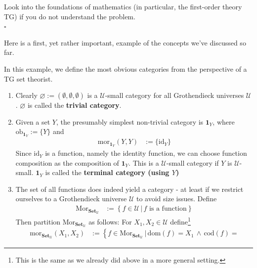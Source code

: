 \begin{prf}
Look into the foundations of mathematics (in particular, the first-order theory TG) if you do not understand the problem.
\\
\phantom{proven}
\hfill
$\square$
\end{prf}
Here is a first, yet rather important, example of the concepts we've discussed so far.
\\
\begin{exa}
\label{exa:basiccats1}
In this example, we define the most obvious categories from the perspective of a TG set theorist.
\begin{enumerate}
\item[(a)]
Clearly $\mathbf{\varnothing} := (\emptyset,\emptyset,\emptyset)$ is a $\mathcal{U}$-small category for all Grothendieck universes $\mathcal{U}$.
$\mathbf{\varnothing}$ is called the \textbf{trivial category}.
\item[(b)]
Given a set $Y$, the presumably simplest non-trivial category is $\mathbf{1}_{Y}$, where $\mathrm{ob}_{\mathbf{1}_{Y}} := \lbrace Y \rbrace$ and
\begin{align*}
  \mathrm{mor}_{\mathbf{1}_{Y}}(Y,Y)
  &:=
  \lbrace
    \mathrm{id}_{Y}
  \rbrace
\end{align*}
Since $\mathrm{id}_{Y}$ is a function, namely the identity function, we can choose function composition as the composition of $\mathbf{1}_{Y}$.
This is a $\mathcal{U}$-small category if $Y$ is $\mathcal{U}$-small.
$\mathbf{1}_{Y}$ is called the \textbf{terminal category (using $Y$)}
\item[(c)]
The set of all functions does indeed yield a category - at least if we restrict ourselves to a Grothendieck universe $\mathcal{U}$ to avoid size issues.
Define
\begin{align*}
  \mathrm{Mor}_{\mathbf{Set}_{\mathcal{U}}}
  &:=
  \left\lbrace
      f
      \in
      \mathcal{U}
    \,
    \vert
    \,
      f
      \text{ is a function}
  \right\rbrace
\end{align*}
Then partition $\mathrm{Mor}_{\mathbf{Set}_{\mathcal{U}}}$ as follows: For $X_{1},X_{2} \in \mathcal{U}$ define\footnote{This is the same as we already did above in a more general setting.}
\begin{align*}
  \mathrm{mor}_{\mathbf{Set}_{\mathcal{U}}}(X_{1},X_{2})
  &:=
  \left\lbrace
      f
      \in
      \mathrm{Mor}_{\mathbf{Set}_{\mathcal{U}}}
    \,
    \vert
    \,
      \mathrm{dom}(f)
      =
      X_{1}
      \,
      \land
      \,
      \mathrm{cod}(f)
      =

\end{align*}
\end{enumerate}
\end{exa}
